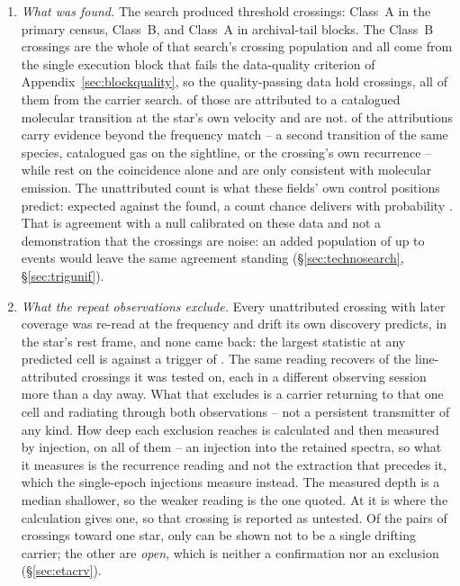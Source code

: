 \begin{enumerate}[leftmargin=1.6em,itemsep=4pt,topsep=4pt,parsep=0pt]
\item \emph{What was found.} The search produced \EvNCrossRaw{} threshold
crossings: \CkNCrossCenA{} Class~A in the primary census, \PrFlagXrossWord{}
Class~B, and \CeNTailCrossWord{} Class~A in archival-tail blocks. The
\PrFlagXrossWord{} Class~B crossings are the whole of that search's crossing
population and all come from the single execution block that fails the
data-quality criterion of Appendix~\ref{sec:blockquality}, so the
quality-passing data hold \EvNCrossQp{} crossings, all of them from the
carrier search. \EvNAttrQp{} of those are attributed to
a catalogued molecular transition at the star's own velocity and
\EvNUnattrQp{} are not.
\LnAttrSupp{} of the \EvNAttrQp{} attributions carry evidence beyond the
frequency match -- a second transition of the same species, catalogued gas on
the sightline, or the crossing's own recurrence -- while \LnAttrCoincWord{}
rest on the coincidence alone and are only consistent with molecular
emission. The unattributed count is what these fields' own control positions
predict: \CeExp{} expected against the \CeObs{} found, a count chance
delivers with probability \CeProbNull. That is agreement with a null
calibrated on these data and not a demonstration that the crossings are
noise: an added population of up to \CeAddLim{} events would leave the same
agreement standing (\S\ref{sec:technosearch}, \S\ref{sec:trigunif}).

\item \emph{What the repeat observations exclude.} Every unattributed crossing
with later coverage was re-read at the frequency and drift its own discovery
predicts, in the star's rest frame, and none came back: the largest statistic
at any predicted cell is \RcTMax{} against a trigger of \StageNullTrig. The
same reading recovers \MkAttrRecur{} of the \MkAttrTested{} line-attributed
crossings it was tested on, each in a different observing session more than a
day away. What
that excludes is a carrier returning to that one cell and radiating through
both observations -- not a persistent transmitter of any kind. How deep each
exclusion reaches is calculated and then measured by injection, on all
\HjNMeas{} of them -- an injection into the retained spectra, so what it
measures is the recurrence reading and not the extraction that precedes it,
which the single-epoch injections measure instead. The measured depth is a
median \HjDevMed{} shallower, so
the weaker reading is the one quoted. At \HjEtaStar{} it is \HjEtaMeas{}
where the calculation gives one, so that crossing is reported as untested.
Of the
\TjNPair{} pairs of crossings toward one star, only \TjNExcl{} can be shown
not to be a single drifting carrier; the other \TjNOpen{} are \emph{open},
which is neither a confirmation nor an exclusion
(\S\ref{sec:etacrv}).


\end{enumerate}
